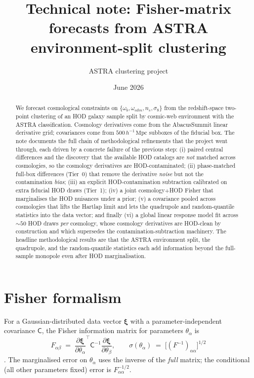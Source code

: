 \documentclass[11pt]{article}
\title{Technical note: Fisher-matrix forecasts from ASTRA
environment-split clustering}
\author{ASTRA clustering project}
\date{June 2026}
\newcommand{\Mpch}{\,h^{-1}\,\mathrm{Mpc}}
\newcommand{\xivec}{\boldsymbol{\xi}}
\begin{document}
\maketitle

\begin{abstract}
We forecast cosmological constraints on $\{\omega_b,\omega_{cdm},n_s,
\sigma_8\}$ from the redshift-space two-point clustering of an HOD galaxy
sample split by cosmic-web environment with the ASTRA classification.
Cosmology derivatives come from the AbacusSummit linear derivative grid;
covariances come from $500\Mpch$ subboxes of the fiducial box.  The note
documents the full chain of methodological refinements that the project
went through, each driven by a concrete failure of the previous step:
(i) paired central differences and the discovery that the available HOD
catalogs are \emph{not} matched across cosmologies, so the cosmology
derivatives are HOD-contaminated; (ii) phase-matched full-box differences
(Tier~0) that remove the derivative \emph{noise} but not the contamination
\emph{bias}; (iii) an explicit HOD-contamination subtraction calibrated on
extra fiducial HOD draws (Tier~1); (iv) a joint cosmology$+$HOD Fisher
that marginalises the HOD nuisances under a prior; (v) a covariance pooled
across cosmologies that lifts the Hartlap limit and lets the quadrupole
and random-quantile statistics into the data vector; and finally (vi) a
global linear response model fit across $\sim 50$ HOD draws \emph{per}
cosmology, whose cosmology derivatives are HOD-clean by construction and
which supersedes the contamination-subtraction machinery.  The headline
methodological results are that the ASTRA environment split, the
quadrupole, and the random-quantile statistics each add information beyond
the full-sample monopole even after HOD marginalisation.
\end{abstract}

\tableofcontents

\section{Fisher formalism}
\label{sec:formalism}

For a Gaussian-distributed data vector $\xivec$ with a parameter-independent
covariance $\mathsf{C}$, the Fisher information matrix for parameters
$\theta_\alpha$ is
\begin{equation}
F_{\alpha\beta} \;=\;
\frac{\partial \xivec}{\partial \theta_\alpha}^{\!\top}
\mathsf{C}^{-1}
\frac{\partial \xivec}{\partial \theta_\beta},
\qquad
\sigma(\theta_\alpha) \;=\; \big[(F^{-1})_{\alpha\alpha}\big]^{1/2}
\label{eq:fisher}
\end{equation}
\cite{tegmark1997}.  The marginalised error on $\theta_\alpha$ uses the
inverse of the \emph{full} matrix; the conditional (all other parameters
fixed) error is $F_{\alpha\alpha}^{-1/2}$.
\end{document}
